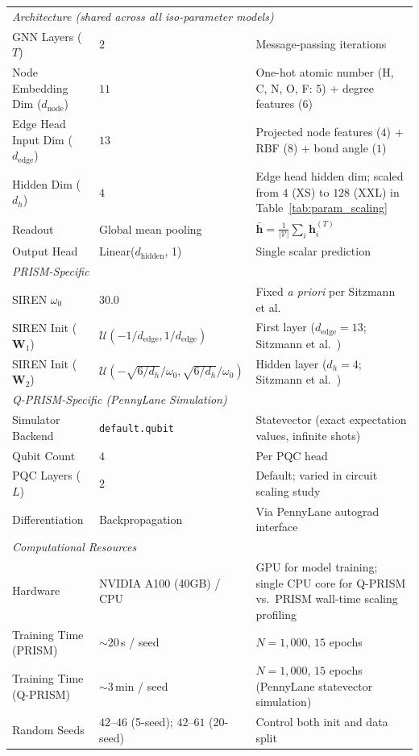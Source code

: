 \begin{table}[t]
{\begin{tabular}{lll}
\midrule
\multicolumn{3}{l}{\textit{Architecture (shared across all iso-parameter models)}} \\
\quad GNN Layers ($T$) & $2$ & Message-passing iterations \\
\quad Node Embedding Dim ($d_{\mathrm{node}}$) & $11$ & One-hot atomic number (H, C, N, O, F: 5) $+$ degree features (6) \\
\quad Edge Head Input Dim ($d_{\mathrm{edge}}$) & $13$ & Projected node features ($4$) $+$ RBF ($8$) $+$ bond angle ($1$) \\
\quad Hidden Dim ($d_h$) & $4$ & Edge head hidden dim; scaled from $4$ (XS) to $128$ (XXL) in Table~\ref{tab:param_scaling} \\
\quad Readout & Global mean pooling & $\bar{\mathbf{h}} = \frac{1}{|\mathcal{V}|}\sum_{i} \mathbf{h}_i^{(T)}$ \\
\quad Output Head & Linear($d_{\mathrm{hidden}}$, 1) & Single scalar prediction \\
\midrule
\multicolumn{3}{l}{\textit{PRISM-Specific}} \\
\quad SIREN $\omega_0$ & $30.0$ & Fixed \textit{a priori} per Sitzmann et al.~\cite{sitzmann2020siren} \\
\quad SIREN Init ($\mathbf{W}_1$) & $\mathcal{U}(-1/d_{\mathrm{edge}}, 1/d_{\mathrm{edge}})$ & First layer ($d_{\mathrm{edge}} = 13$; Sitzmann et al.~\cite{sitzmann2020siren}) \\
\quad SIREN Init ($\mathbf{W}_2$) & $\mathcal{U}(-\sqrt{6/d_h}/\omega_0, \sqrt{6/d_h}/\omega_0)$ & Hidden layer ($d_h = 4$; Sitzmann et al.~\cite{sitzmann2020siren}) \\
\midrule
\multicolumn{3}{l}{\textit{Q-PRISM-Specific (PennyLane Simulation)}} \\
\quad Simulator Backend & \texttt{default.qubit} & Statevector (exact expectation values, infinite shots) \\
\quad Qubit Count & $4$ & Per PQC head \\
\quad PQC Layers ($L$) & $2$ & Default; varied in circuit scaling study \\
\quad Differentiation & Backpropagation & Via PennyLane autograd interface \\
\midrule
\multicolumn{3}{l}{\textit{Computational Resources}} \\
\quad Hardware & NVIDIA A100 (40GB) / CPU & GPU for model training; single CPU core for Q-PRISM vs.\ PRISM wall-time scaling profiling \\
\quad Training Time (PRISM) & $\sim 20$\,s / seed & $N = 1{,}000$, $15$ epochs \\
\quad Training Time (Q-PRISM) & $\sim 3$\,min / seed & $N = 1{,}000$, $15$ epochs (PennyLane statevector simulation) \\
\quad Random Seeds & $42$--$46$ (5-seed); $42$--$61$ (20-seed) & Control both init and data split \\
\bottomrule
\end{tabular}%
}
\end{table}
